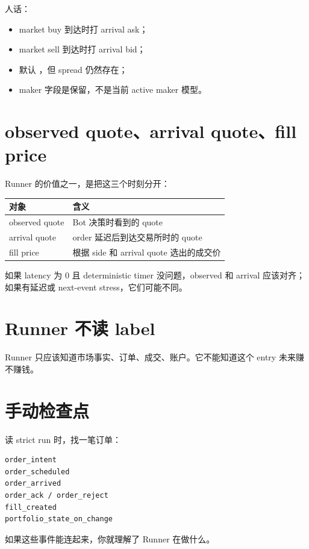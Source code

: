 人话：

\begin{itemize}[leftmargin=2em]
  \item market buy 到达时打 arrival ask；
  \item market sell 到达时打 arrival bid；
  \item 默认 ，但 spread 仍然存在；
  \item maker 字段是保留，不是当前 active maker 模型。
\end{itemize}

\section{observed quote、arrival quote、fill price}

Runner 的价值之一，是把这三个时刻分开：

\begin{longtable}{p{}p{}}
\toprule
对象 & 含义 \\
\midrule
observed quote & Bot 决策时看到的 quote \\
arrival quote & order 延迟后到达交易所时的 quote \\
fill price & 根据 side 和 arrival quote 选出的成交价 \\
\bottomrule
\end{longtable}

如果 latency 为 0 且 deterministic timer 没问题，observed 和 arrival 应该对齐；如果有延迟或 next-event stress，它们可能不同。

\section{Runner 不读 label}

Runner 只应该知道市场事实、订单、成交、账户。它不能知道这个 entry 未来赚不赚钱。


\section{手动检查点}

读 strict run 时，找一笔订单：

\begin{lstlisting}
order_intent
order_scheduled
order_arrived
order_ack / order_reject
fill_created
portfolio_state_on_change
\end{lstlisting}

如果这些事件能连起来，你就理解了 Runner 在做什么。

